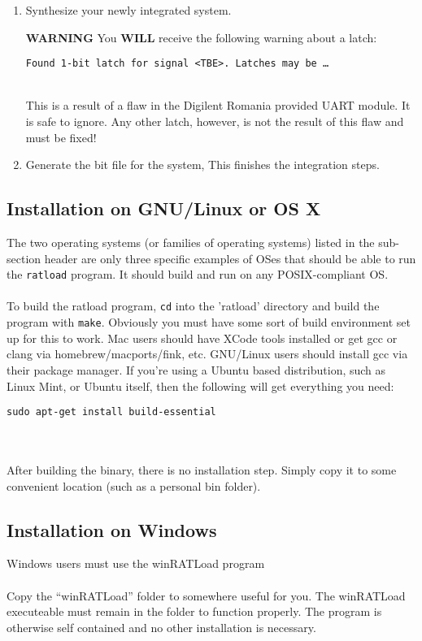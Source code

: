 \documentclass[notitlepage]{article}
\newcommand{\warningsign}{\fontencoding{U}\fontfamily{futs}\selectfont\char 66\relax}
\begin{document}
\begin{enumerate}
\item Synthesize your newly integrated system.
\begin{infobox}
\textbf{{\warningsign} WARNING} You \textbf{WILL} receive the following warning about a latch:\\
\centerline{\texttt{Found 1-bit latch for signal \textless TBE\textgreater. Latches may be \ldots}}\\
This is a result of a flaw in the Digilent Romania provided UART module. It is safe to ignore. Any other latch, however, is not the result of this flaw and must be fixed!
\end{infobox}

\item Generate the bit file for the system, This finishes the integration steps.
\end{enumerate}

\subsection{Installation on GNU/Linux or OS X}
The two operating systems (or families of operating systems) listed in the sub-section header are only three specific examples of OSes that should be able to run the \texttt{ratload} program. It should build and run on any POSIX-compliant OS.\\\\
To build the ratload program, \texttt{cd} into the 'ratload' directory and build the program with \texttt{make}. Obviously you must have some sort of build environment set up for this to work. Mac users should have XCode tools installed or get gcc or clang via homebrew/macports/fink, etc. GNU/Linux users should install gcc via their package manager. If you're using a Ubuntu based distribution, such as Linux Mint, or Ubuntu itself, then the following will get everything you need:\\
\centerline{\texttt{sudo apt-get install build-essential}}\\\\
After building the binary, there is no installation step. Simply copy it to some convenient location (such as a personal bin folder).

\subsection{Installation on Windows}
Windows users must use the winRATLoad program\\\\
Copy the ``winRATLoad'' folder to somewhere useful for you. The winRATLoad executeable must remain in the folder to function properly. The program is otherwise self contained and no other installation is necessary.
\end{document}
